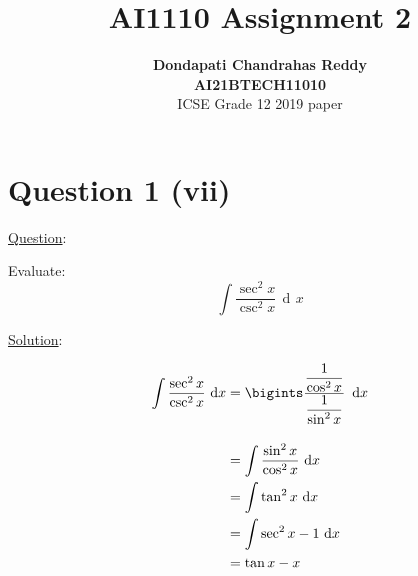 \documentclass[journal,12pt,twocolumn]{IEEEtran}
\DeclareMathOperator{\di}{d\!}
\begin{document}
\title{\textbf{AI1110 Assignment 2} }
\author{\textbf{Dondapati Chandrahas Reddy}\\\textbf{AI21BTECH11010}\\ ICSE Grade 12 2019 paper}
\maketitle

{\section{Question 1 (vii)\newline}}

{\large \underline{Question}:\newline}

Evaluate:
\begin{equation*}
	\int \dfrac{\sec^2 x}{\csc^2 x} \,\di x 
\end{equation*}

{\large \underline{Solution}:}

\begin{align*}
	\int \dfrac{\sec^2 x}{\csc^2 x} \,\di x &= \bigints \dfrac{\dfrac{1}{\cos^2 x}}{\dfrac{1}{\sin^2 x}} \,\,\di x \\[1em]
	&= \int \dfrac{\sin^2 x}{\cos^2 x} \, \di x \\
	&= \int \tan^2 x \,\di x \\
	&= \int \sec^2 x-1 \,\di x \\
	&= \tan x - x
\end{align*}
\end{document}
